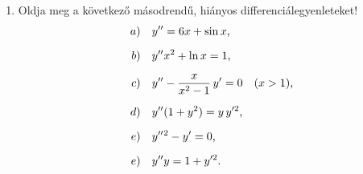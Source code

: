 \documentclass[a4paper, 12pt, fleqn]{scrartcl}
\begin{document}
\begin{enumerate}
  \item Oldja meg a következő másodrendű, hiányos differenciálegyenleteket!
        \begin{align*}
          a) \quad y'' & = 6x + \sin x
          \text,                                                     \\[2mm]
          b) \quad y'' & x^2 + \ln x = 1
          \text,                                                     \\[2mm]
          c) \quad y'' & - \frac{x}{x^2 - 1} \, y' = 0 \quad (x > 1)
          \text,                                                     \\[2mm]
          d) \quad y'' & (1 + y^2) = y \, y'^2
          \text,                                                     \\[2mm]
          e) \quad y'' & {}^2 - y' = 0
          \text,                                                     \\[2mm]
          e) \quad y'' & y = 1 + y'^2
          \text.                                                     \\[2mm]
        \end{align*}
\end{enumerate}
\end{document}

